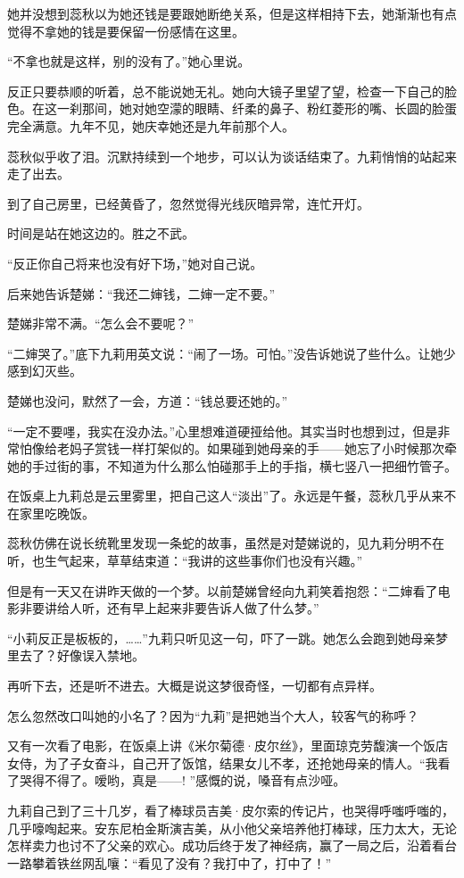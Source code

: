 \par 她并没想到蕊秋以为她还钱是要跟她断绝关系，但是这样相持下去，她渐渐也有点觉得不拿她的钱是要保留一份感情在这里。
\par “不拿也就是这样，别的没有了。”她心里说。
\par 反正只要恭顺的听着，总不能说她无礼。她向大镜子里望了望，检查一下自己的脸色。在这一刹那间，她对她空濛的眼睛、纤柔的鼻子、粉红菱形的嘴、长圆的脸蛋完全满意。九年不见，她庆幸她还是九年前那个人。
\par 蕊秋似乎收了泪。沉默持续到一个地步，可以认为谈话结束了。九莉悄悄的站起来走了出去。
\par 到了自己房里，已经黄昏了，忽然觉得光线灰暗异常，连忙开灯。
\par 时间是站在她这边的。胜之不武。
\par “反正你自己将来也没有好下场，”她对自己说。
\par 后来她告诉楚娣：“我还二婶钱，二婶一定不要。”
\par 楚娣非常不满。“怎么会不要呢？”
\par “二婶哭了。”底下九莉用英文说：“闹了一场。可怕。”没告诉她说了些什么。让她少感到幻灭些。
\par 楚娣也没问，默然了一会，方道：“钱总要还她的。”
\par “一定不要嚜，我实在没办法。”心里想难道硬挜给他。其实当时也想到过，但是非常怕像给老妈子赏钱一样打架似的。如果碰到她母亲的手——她忘了小时候那次牵她的手过街的事，不知道为什么那么怕碰那手上的手指，横七竖八一把细竹管子。
\par 在饭桌上九莉总是云里雾里，把自己这人“淡出”了。永远是午餐，蕊秋几乎从来不在家里吃晚饭。
\par 蕊秋仿佛在说长统靴里发现一条蛇的故事，虽然是对楚娣说的，见九莉分明不在听，也生气起来，草草结束道：“我讲的这些事你们也没有兴趣。”
\par 但是有一天又在讲昨天做的一个梦。以前楚娣曾经向九莉笑着抱怨：“二婶看了电影非要讲给人听，还有早上起来非要告诉人做了什么梦。”
\par “小莉反正是板板的，……”九莉只听见这一句，吓了一跳。她怎么会跑到她母亲梦里去了？好像误入禁地。
\par 再听下去，还是听不进去。大概是说这梦很奇怪，一切都有点异样。
\par 怎么忽然改口叫她的小名了？因为“九莉”是把她当个大人，较客气的称呼？
\par 又有一次看了电影，在饭桌上讲《米尔菊德·皮尔丝》，里面琼克劳馥演一个饭店女侍，为了子女奋斗，自己开了饭馆，结果女儿不孝，还抢她母亲的情人。“我看了哭得不得了。嗳哟，真是——! ”感慨的说，嗓音有点沙哑。
\par 九莉自己到了三十几岁，看了棒球员吉美·皮尔索的传记片，也哭得呼嗤呼嗤的，几乎嚎啕起来。安东尼柏金斯演吉美，从小他父亲培养他打棒球，压力太大，无论怎样卖力也讨不了父亲的欢心。成功后终于发了神经病，赢了一局之后，沿着看台一路攀着铁丝网乱嚷：“看见了没有？我打中了，打中了！”
